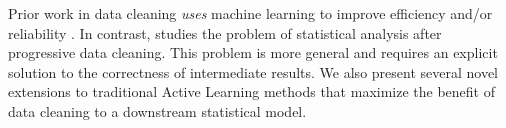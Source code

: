 Prior work in data cleaning \emph{uses} machine learning to improve efficiency and/or reliability \cite{DBLP:journals/pvldb/YakoutENOI11, gokhale2014corleone, yakout2013don, DBLP:journals/pvldb/HaasKWF015}.
In contrast, \sys studies the problem of statistical analysis after progressive data cleaning.
This problem is more general and requires an explicit solution to the correctness of intermediate results.
We also present several novel extensions to traditional Active Learning methods that maximize the benefit of data cleaning to a downstream statistical model.









